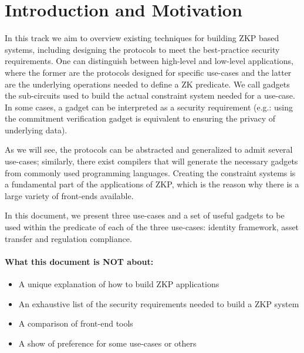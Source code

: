 \section{Introduction and Motivation}
\label{apps:intro}
 
In this track we aim to overview existing techniques for building ZKP based systems, including designing the protocols to meet the best-practice security requirements. One can distinguish between high-level and low-level applications, where the former are the protocols designed for specific use-cases and the latter are the underlying operations needed to define a ZK predicate. We call gadgets the sub-circuits used to build the actual constraint system needed for a use-case. In some cases, a gadget can be interpreted as a security requirement (e.g.: using the commitment verification gadget is equivalent to ensuring the privacy of underlying data). 

As we will see, the protocols can be abstracted and generalized to admit several use-cases; similarly, there exist compilers that will generate the necessary gadgets from commonly used programming languages. Creating the constraint systems is a fundamental part of the applications of ZKP, which is the reason why there is a large variety of front-ends available.

In this document, we present three use-cases and a set of useful gadgets to be used within the predicate of each of the three use-cases: identity framework, asset transfer and regulation compliance.


\paragraph{What this document is NOT about:}
\begin{itemize}
 \item A unique explanation of how to build ZKP applications
 \item An exhaustive list of the security requirements needed to build a ZKP system
 \item A comparison of front-end tools
 \item A show of preference for some use-cases or others
\end{itemize}

